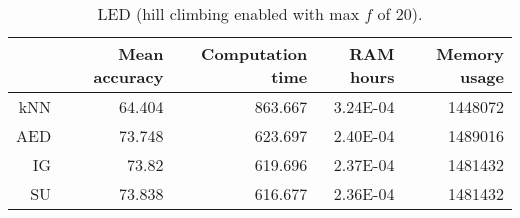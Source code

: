 \begin{table}[h]
\centering
\begin{tabular}{r|rrrr}	
    & Mean accuracy & Computation time & RAM hours & Memory usage \\ \hline
kNN & 64.404                   & 863.667         & 3.24E-04  & 1448072      \\
AED & 73.748                   & 623.697         & 2.40E-04  & 1489016      \\
IG  & 73.82                    & 619.696         & 2.37E-04  & 1481432      \\
SU  & 73.838                   & 616.677         & 2.36E-04  & 1481432      
\end{tabular}
\caption{LED (hill climbing enabled with max $f$ of 20).}
\label{Table:LED_H}
\end{table}